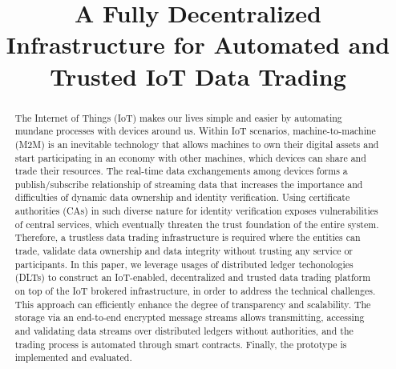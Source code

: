 \documentclass[conference]{IEEEtran}
\begin{document}
\title{A Fully Decentralized Infrastructure for Automated and Trusted IoT Data Trading}

\author{
\and
{}
\and
{}
}

\maketitle


\begin{abstract} 
The Internet of Things (IoT) makes our lives simple and easier by automating mundane processes with devices around us. Within IoT scenarios, machine-to-machine (M2M) is an inevitable technology that allows machines to own their digital assets and start participating in an economy with other machines, which devices can share and trade their resources. The real-time data exchangements among devices forms a publish/subscribe relationship of streaming data that increases the importance and difficulties of dynamic data ownership and identity verification. Using certificate authorities (CAs) in such diverse nature for identity verification exposes vulnerabilities of central services, which eventually threaten the trust foundation of the entire system. Therefore, a trustless data trading infrastructure is required where the entities can trade, validate data ownership and data integrity without trusting any service or participants. In this paper, we leverage usages of distributed ledger techonologies (DLTs) to construct an IoT-enabled, decentralized and trusted data trading platform on top of the IoT brokered infrastructure, in order to address the technical challenges. This approach can efficiently enhance the degree of transparency and scalability. The storage via an end-to-end encrypted message streams allows transmitting, accessing and validating data streams over distributed ledgers without authorities, and the trading process is automated through smart contracts. Finally, the prototype is implemented and evaluated.
\end{abstract}
\end{document}
